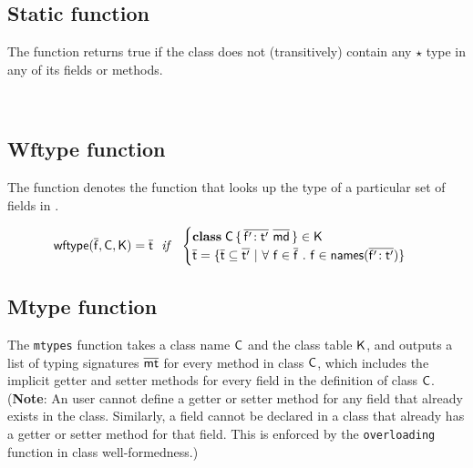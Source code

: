 \documentclass[a4paper,USenglish]{tex/lipics-v2016}
\begin{document}
\subsection{Static function}

The  function returns true if the class \D does not (transitively) contain any $\star$ type
in any of its fields or methods.


\begin{mathpar}



\end{mathpar}
\\

\subsection{Wftype function}

The function \wftype{\b\f}\C\K denotes the function that looks up the type of a particular set of fields in \C.

\begin{equation*}
\wftype{\b\f}\C\K = \b\t ~~\mathit{if}~~ \begin{cases}

 \Class \C {\b{\Ftype\fp\tp}}{\b\md} \in \K\\
 \b\t = \{ \b\t \subseteq \b\tp ~|~ \forall~ \f \in \b\f ~.~ \f \in \names{\b{\Ftype\fp\tp}} \} \\
 
\end{cases}
\end{equation*}

\subsection{Mtype function}

The \texttt{mtypes} function takes a class name $\C$ and the class table
$\K$, and outputs a list of typing signatures $\b\mt$ for every method in
class $\C$, which includes the implicit getter and setter methods for every
field in the definition of class $\C$.  (\textbf{Note}: An user cannot
define a getter or setter method for any field that already exists in the
class. Similarly, a field cannot be declared in a class that already has a
getter or setter method for that field. This is enforced by the
\texttt{overloading} function in class well-formedness.)
\end{document}
